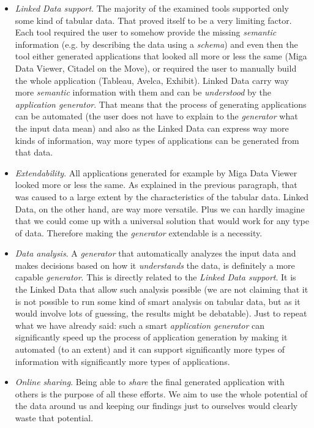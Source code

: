 \begin{itemize}
\item \emph{Linked Data support}. The majority of the examined tools supported only some kind of tabular data. That proved itself to be a very limiting factor. Each tool required the user to somehow provide the missing \emph{semantic} information (e.g. by describing the data using a \emph{schema}) and even then the tool either generated applications that looked all more or less the same (Miga Data Viewer, Citadel on the Move), or required the user to manually build the whole application (Tableau, Avelca, Exhibit). Linked Data carry way more \emph{semantic} information with them and can be \emph{understood} by the \emph{application generator}. That means that the process of generating applications can be automated (the user does not have to explain to the \emph{generator} what the input data mean) and also as the Linked Data can express way more kinds of information, way more types of applications can be generated from that data.
%
%
%
\item \emph{Extendability}. All applications generated for example by Miga Data Viewer looked more or less the same. As explained in the previous paragraph, that was caused to a large extent by the characteristics of the tabular data. Linked Data, on the other hand, are way more versatile. Plus we can hardly imagine that we could come up with a universal solution that would work for any type of data. Therefore making the \emph{generator} extendable is a necessity.
\item \emph{Data analysis}. A \emph{generator} that automatically analyzes the input data and makes decisions based on how it \emph{understands} the data, is definitely a more capable \emph{generator}. This is directly related to the \emph{Linked Data support}. It is the Linked Data that allow such analysis possible (we are not claiming that it is not possible to run some kind of smart analysis on tabular data, but as it would involve lots of guessing, the results might be debatable). Just to repeat what we have already said: such a smart \emph{application generator} can significantly speed up the process of application generation by making it automated (to an extent) and it can support significantly more types of information with significantly more types of applications.
\item \emph{Online sharing}. Being able to \emph{share} the final generated application with others is the purpose of all these efforts. We aim to use the whole potential of the data around us and keeping our findings just to ourselves would clearly waste that potential.

\end{itemize}
